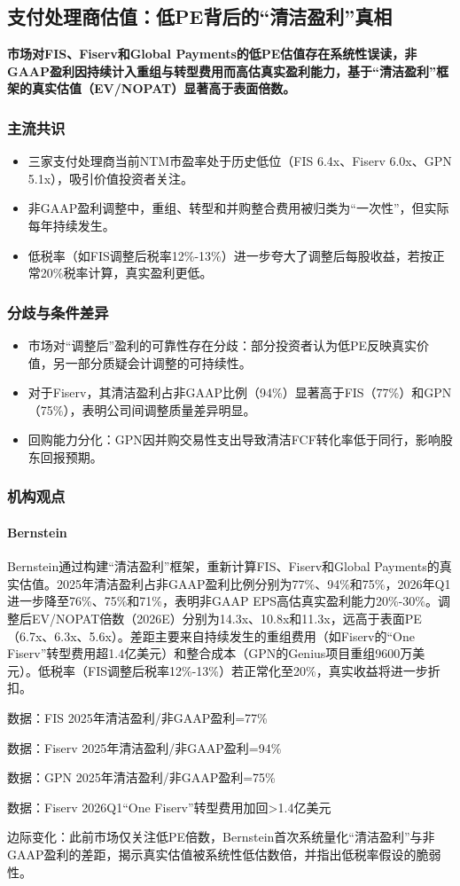 \documentclass[11pt]{ctexart}
\begin{document}
\subsection{支付处理商估值：低PE背后的“清洁盈利”真相}
\textbf{市场对FIS、Fiserv和Global Payments的低PE估值存在系统性误读，非GAAP盈利因持续计入重组与转型费用而高估真实盈利能力，基于“清洁盈利”框架的真实估值（EV/NOPAT）显著高于表面倍数。}
\subsubsection*{主流共识}
\begin{itemize}
  \item 三家支付处理商当前NTM市盈率处于历史低位（FIS 6.4x、Fiserv 6.0x、GPN 5.1x），吸引价值投资者关注。
  \item 非GAAP盈利调整中，重组、转型和并购整合费用被归类为“一次性”，但实际每年持续发生。
  \item 低税率（如FIS调整后税率12\%-13\%）进一步夸大了调整后每股收益，若按正常20\%税率计算，真实盈利更低。
\end{itemize}
\subsubsection*{分歧与条件差异}
\begin{itemize}
  \item 市场对“调整后”盈利的可靠性存在分歧：部分投资者认为低PE反映真实价值，另一部分质疑会计调整的可持续性。
  \item 对于Fiserv，其清洁盈利占非GAAP比例（94\%）显著高于FIS（77\%）和GPN（75\%），表明公司间调整质量差异明显。
  \item 回购能力分化：GPN因并购交易性支出导致清洁FCF转化率低于同行，影响股东回报预期。
\end{itemize}
\subsubsection*{机构观点}
\paragraph{Bernstein} Bernstein通过构建“清洁盈利”框架，重新计算FIS、Fiserv和Global Payments的真实估值。2025年清洁盈利占非GAAP盈利比例分别为77\%、94\%和75\%，2026年Q1进一步降至76\%、75\%和71\%，表明非GAAP EPS高估真实盈利能力20\%-30\%。调整后EV/NOPAT倍数（2026E）分别为14.3x、10.8x和11.3x，远高于表面PE（6.7x、6.3x、5.6x）。差距主要来自持续发生的重组费用（如Fiserv的“One Fiserv”转型费用超1.4亿美元）和整合成本（GPN的Genius项目重组9600万美元）。低税率（FIS调整后税率12\%-13\%）若正常化至20\%，真实收益将进一步折扣。
{\small\color{refgray}数据：FIS 2025年清洁盈利/非GAAP盈利=77\%\par}
{\small\color{refgray}数据：Fiserv 2025年清洁盈利/非GAAP盈利=94\%\par}
{\small\color{refgray}数据：GPN 2025年清洁盈利/非GAAP盈利=75\%\par}
{\small\color{refgray}数据：Fiserv 2026Q1“One Fiserv”转型费用加回>1.4亿美元\par}
{\small\color{refgray}边际变化：此前市场仅关注低PE倍数，Bernstein首次系统量化“清洁盈利”与非GAAP盈利的差距，揭示真实估值被系统性低估数倍，并指出低税率假设的脆弱性。\par}
\end{document}
